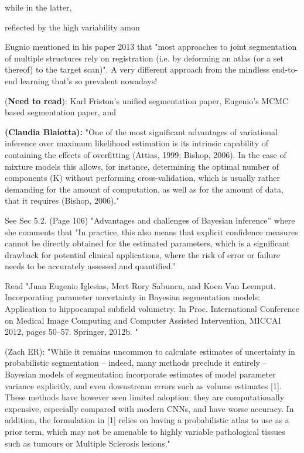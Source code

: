 while in the latter, 


reflected by the high variability amon



Eugnio mentioned in his paper 2013 \cite{iglesias2011combining} that "most approaches to joint segmentation of multiple structures rely on registration (i.e. by deforming an atlas (or a set thereof) to the target scan)". A very different approach from the mindless end-to-end learning that's so prevalent nowadays!  

(\textbf{Need to read}): Karl Friston's unified segmentation paper, Eugenio's MCMC based segmentation paper, and 

\textbf{(Claudia Blaiotta): } "One of the most significant advantages of variational inference over maximum likelihood estimation is its intrinsic capability of containing the effects of overfitting (Attias, 1999; Bishop, 2006). In the case of mixture models this allows, for instance, determining the optimal number of components (K) without performing cross-validation, which is usually rather demanding for the amount of computation, as well as for the amount of data, that it requires (Bishop, 2006)."

See Sec 5.2. (Page 106) "Advantages and challenges of Bayesian inference” where she comments that 
"In practice, this also means that explicit confidence measures cannot be directly obtained for the estimated parameters, which is a significant drawback for potential clinical applications, where the risk of error or failure needs to be accurately assessed and quantified.” 

Read "Juan Eugenio Iglesias, Mert Rory Sabuncu, and Koen Van Leemput. Incorporating parameter uncertainty in Bayesian segmentation models: Application to hippocampal subfield volumetry. In Proc. International Conference on Medical Image Computing and Computer Assisted Intervention, MICCAI 2012, pages 50–57. Springer, 2012b. "

(Zach ER): "While it remains uncommon to calculate estimates of uncertainty in probabilistic segmentation – indeed, many methods preclude it entirely – Bayesian models of segmentation incorporate estimates of model parameter variance explicitly, and even downstream errors such as volume estimates [1]. These methods have however seen limited adoption: they are computationally expensive, especially compared with modern CNNs, and have worse accuracy. In addition, the formulation in [1] relies on having a probabilistic atlas to use as a prior term, which may not be amenable to highly variable pathological tissues such as tumours or Multiple Sclerosis lesions."

